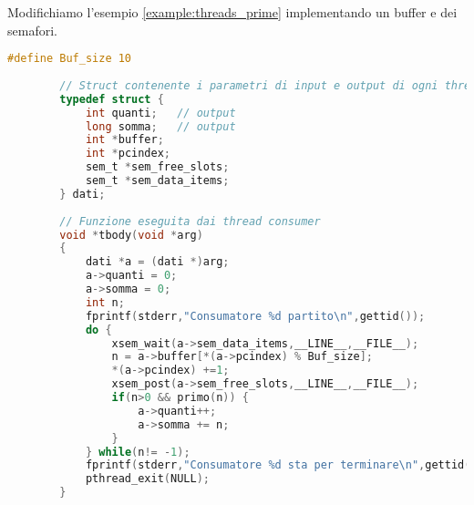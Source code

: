 \begin{example}
	Modifichiamo l'esempio \ref{example:threads_prime} implementando un buffer e dei semafori.
	\label{example:semafori}
	\begin{lstlisting}[language=C]
		#define Buf_size 10
		
		// Struct contenente i parametri di input e output di ogni thread 
		typedef struct {
			int quanti;   // output
			long somma;   // output
			int *buffer; 
			int *pcindex;
			sem_t *sem_free_slots;
			sem_t *sem_data_items;  
		} dati;
		
		// Funzione eseguita dai thread consumer
		void *tbody(void *arg)
		{  
			dati *a = (dati *)arg; 
			a->quanti = 0;
			a->somma = 0;
			int n;
			fprintf(stderr,"Consumatore %d partito\n",gettid());
			do {
				xsem_wait(a->sem_data_items,__LINE__,__FILE__);
				n = a->buffer[*(a->pcindex) % Buf_size];
				*(a->pcindex) +=1;
				xsem_post(a->sem_free_slots,__LINE__,__FILE__);
				if(n>0 && primo(n)) {
					a->quanti++;
					a->somma += n;
				}
			} while(n!= -1);
			fprintf(stderr,"Consumatore %d sta per terminare\n",gettid());
			pthread_exit(NULL); 
		}     
		

\end{lstlisting}
\end{example}
